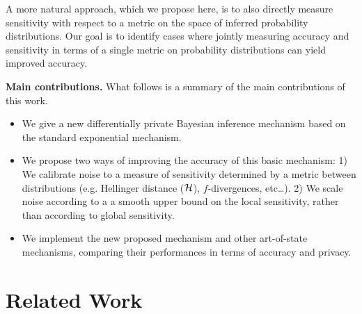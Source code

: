\documentclass{article}
\begin{document}
A more natural approach, which we propose here, is to also directly measure sensitivity with respect
to a metric on the space of inferred probability distributions. Our goal is to identify cases where jointly measuring
accuracy and sensitivity in terms of a single metric on probability distributions can yield improved accuracy. 
{\color{red}{MB: Is this accurate? Would we ever want to use different metrics for accuracy and sensitivity?}}





\noindent \textbf{Main contributions.}
What follows is a summary of the main contributions of this work.
\begin{itemize}
	\item We give a new differentially private Bayesian inference mechanism based on the standard exponential mechanism.
	\item We propose two ways of improving the accuracy of this basic mechanism: 1) We calibrate noise to a measure of sensitivity determined by a metric between distributions
      (e.g. Hellinger distance ($\mathcal{H}$), $f$-divergences, etc\dots). 2) We scale noise according to a a smooth upper bound on the local sensitivity, rather than according to global sensitivity.
  \item We implement the new proposed mechanism and other art-of-state mechanisms, comparing their performances in terms of accuracy and privacy.
\end{itemize}

\section{Related Work}
\end{document}
